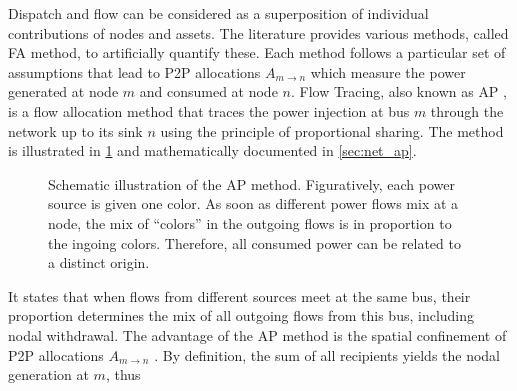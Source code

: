 \documentclass[11pt,twocolumn]{article}
\begin{document}
Dispatch and flow can be considered as a superposition of individual contributions of nodes and assets. The literature provides various methods, called \ac{FA} method, to artificially quantify these. Each method follows a particular set of assumptions that lead to \ac{P2P} allocations $A_{m \rightarrow n}$ which measure the power generated at node $m$ and consumed at node $n$. Flow Tracing, also known as \ac{AP} \cite{bialek_tracing_1996}, is a flow allocation method that traces the power injection at bus $m$ through the network up to its sink $n$ using the principle of proportional sharing. The method is illustrated in \cref{fig:ap-scheme} and mathematically documented in \cref{sec:net_ap}. 
\begin{figure}
    \centering
    \caption{Schematic illustration of the \ac{AP} method. Figuratively, each power source is given one color. As soon as different power flows mix at a node, the mix of ``colors'' in the outgoing flows is in proportion to the ingoing colors. Therefore, all consumed power can be related to a distinct origin.}
    \label{fig:ap-scheme}
\end{figure}
It states that when flows from different sources meet at the same bus, their proportion determines the mix of all outgoing flows from this bus, including nodal withdrawal. The advantage of the \ac{AP} method is the spatial confinement of \ac{P2P} allocations $A_{m \rightarrow n}$ \cite{hofmann_techno-economic_2020}. By definition, the sum of all recipients yields the nodal generation at $m$, thus
\end{document}
